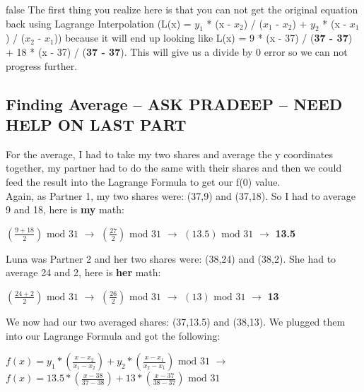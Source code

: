\documentclass[10pt]{article}
\begin{document}
\if false
The first thing you realize here is that you can not get the original equation back using Lagrange Interpolation (L(x) = $y_1$ * (x - $x_2$) / ($x_1$ - $x_2$) + $y_2$ * (x - $x_1$) / ($x_2$ - $x_1$)) because it will end up looking like L(x) = 9 * (x - 37) / (\textbf{37 - 37}) + 18 * (x - 37) / (\textbf{37 - 37}). This will give us a divide by 0 error so we can not progress further. 
\fi

\vspace{0.2in}
\subsection{Finding Average -- ASK PRADEEP -- NEED HELP ON LAST PART}
\noindent For the average, I had to take my two shares and average the y coordinates together, my partner had to do the same with their shares and then we could feed the result into the Lagrange Formula to get our f(0) value.\\
Again, as Partner 1, my two shares were: (37,9) and (37,18). 
So I had to average 9 and 18, here is \textbf{my} math:\\ \vspace{0.1in}

$\left(\frac{9+18}{2}\right) \textrm{ mod } 31$ $\rightarrow$
$\left(\frac{27}{2}\right) \textrm{ mod } 31$ $\rightarrow$ 
$\left(13.5\right) \textrm{ mod } 31$ $\rightarrow$ \textbf{13.5}\\
\newline

\noindent Luna was Partner 2 and her two shares were: (38,24) and (38,2). 
She had to average 24 and 2, here is \textbf{her} math:\\ \vspace{0.1in}

$\left(\frac{24+2}{2}\right) \textrm{ mod } 31$ $\rightarrow$
$\left(\frac{26}{2}\right) \textrm{ mod } 31$ $\rightarrow$ 
$\left(13\right) \textrm{ mod } 31$ $\rightarrow$ \textbf{13}\\
\newline

\noindent We now had our two averaged shares: (37,13.5) and (38,13). We plugged them into our Lagrange Formula and got the following:\\ \vspace{0.1in}

$f(x) = y_1*\left(\frac{x - x_2}{x_1 - x_2}\right) + y_2*\left(\frac{x - x_1}{x_2 - x_1}\right) \textrm{ mod } 31$ 
$\rightarrow$
$f(x) = 13.5*\left(\frac{x - 38}{37 - 38}\right) + 13*\left(\frac{x - 37}{38 - 37}\right) \textrm{ mod } 31$\\
\end{document}
